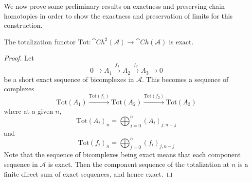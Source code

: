 



We now prove some preliminary results on exactness and preserving chain homotopies in order to show the exactness and preservation of limits for this construction.

\begin{lem}[label=lem:TotExact]
    The totalization functor $\text{Tot}:\cat{Ch}^2(\mathcal{A})\rightarrow \cat{Ch}(\mathcal{A})$ is exact.
\end{lem}
\begin{proof}
    Let 
    \begin{equation*}
        0\rightarrow A_1\xrightarrow{f_1} A_2\xrightarrow{f_2} A_3\rightarrow 0
    \end{equation*}
    be a short exact sequence of bicomplexes in $\mathcal{A}$. This becomes a sequence of complexes 
    \begin{equation*}
        \text{Tot}(A_1)\xrightarrow{\text{Tot}(f_1)}\text{Tot}(A_2)\xrightarrow{\text{Tot}(f_2)}\text{Tot}(A_3)
    \end{equation*}
    where at a given $n$,
    \begin{equation*}
        \text{Tot}(A_i)_n = \bigoplus_{j=0}^n(A_i)_{j,n-j}
    \end{equation*}
    and
    \begin{equation*}
        \text{Tot}(f_i)_n = \bigoplus_{j=0}^n (f_i)_{j,n-j}
    \end{equation*}
    Note that the sequence of bicomplexes being exact means that each component sequence in $\mathcal{A}$ is exact. Then the component sequence of the totalization at $n$ is a finite direct sum of exact sequences, and hence exact.
\end{proof}

